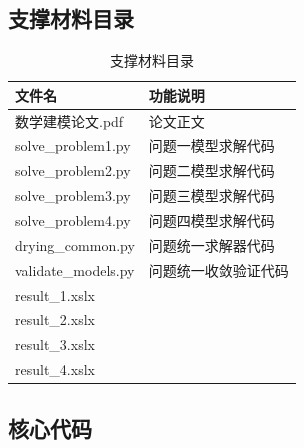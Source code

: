 \documentclass[12pt,a4paper]{ctexart}
\begin{document}
\subsection{支撑材料目录}
\begin{table}[H]
\centering
\begin{tabularx}{\textwidth}{@{}lX@{}}
\toprule
\textbf{文件名} & \textbf{功能说明} \\
\midrule
数学建模论文.pdf & 论文正文 \\
solve\_problem1.py & 问题一模型求解代码 \\
solve\_problem2.py & 问题二模型求解代码 \\
solve\_problem3.py & 问题三模型求解代码\\
solve\_problem4.py & 问题四模型求解代码\\
drying\_common.py & 问题统一求解器代码\\
validate\_models.py & 问题统一收敛验证代码\\

result\_1.xslx\\
result\_2.xslx\\
result\_3.xslx\\
result\_4.xslx\\


\bottomrule

\end{tabularx}
\caption{支撑材料目录}
\end{table}

\subsection{核心代码}
\end{document}
